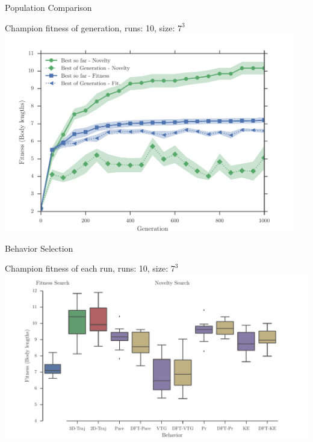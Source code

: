 \documentclass[6pt]{beamer}
\begin{document}
{\begin{frame}{Population Comparison}
\begin{block}{Champion fitness of generation, runs: 10, size: $7^3$}
\centering
\includegraphics[width=0.95\textwidth]{../Figures/Results/AvgGenerChampNoveltyFitnessSize7.pdf}
\end{block}
\end{frame}

\begin{frame}{Behavior Selection}
\begin{block}{Champion fitness of each run, runs: 10, size: $7^3$}
\centering
\includegraphics[width=1.0\textwidth]{../Figures/Results/BehaviorsPerformance.pdf}
\end{block}
\end{frame}

}
\end{document}
